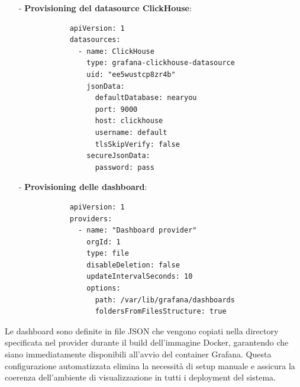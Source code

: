 \documentclass[10pt]{article}
\newcommand{\myparagraph}[1]{\paragraph{#1}\mbox{}\\}
\newcommand{\mysubparagraph}[1]{\subparagraph{#1}\mbox{}\\}
\begin{document}
        \begin{itemize}
            \item[-] \textbf{Provisioning del datasource ClickHouse}:
            \begin{lstlisting}
            apiVersion: 1
            datasources:
              - name: ClickHouse
                type: grafana-clickhouse-datasource
                uid: "ee5wustcp8zr4b"
                jsonData:
                  defaultDatabase: nearyou
                  port: 9000
                  host: clickhouse
                  username: default
                  tlsSkipVerify: false
                secureJsonData:
                  password: pass
            \end{lstlisting}

            \item[-] \textbf{Provisioning delle dashboard}:
            \begin{lstlisting}
            apiVersion: 1
            providers:
              - name: "Dashboard provider"
                orgId: 1
                type: file
                disableDeletion: false
                updateIntervalSeconds: 10
                options:
                  path: /var/lib/grafana/dashboards
                  foldersFromFilesStructure: true
            \end{lstlisting}
        \end{itemize}

        Le dashboard sono definite in file JSON che vengono copiati nella directory specificata nel provider durante il build dell'immagine Docker, garantendo che siano immediatamente disponibili all'avvio del container Grafana. Questa configurazione automatizzata elimina la necessità di setup manuale e assicura la coerenza dell'ambiente di visualizzazione in tutti i deployment del sistema.


\end{document}
